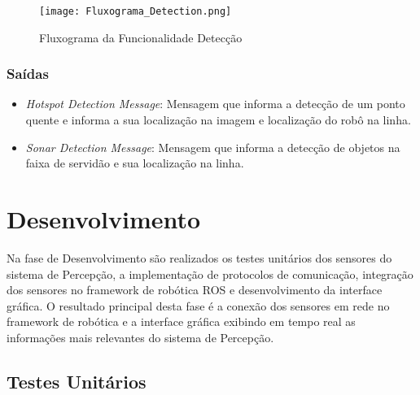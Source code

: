\begin{figure}[!ht]
	\centering
	\texttt{[image: Fluxograma\_Detection.png]}
	\caption{Fluxograma da Funcionalidade Detecção} \label{FuncDetec}
\end{figure}

\subsubsection{Saídas}

\begin{itemize}
	\item \textit{Hotspot Detection Message}: Mensagem que informa a detecção de um ponto quente e informa a sua localização na imagem e localização do robô na linha.
	\item \textit{Sonar Detection Message}: Mensagem que informa a detecção de objetos na faixa de servidão e sua localização na linha.
\end{itemize}
	
	\section{Desenvolvimento}
	Na fase de Desenvolvimento são realizados os testes unitários dos sensores do sistema de Percepção, a implementação de protocolos de comunicação, integração dos sensores no framework de robótica ROS e desenvolvimento da interface gráfica. O resultado principal desta fase é a conexão dos sensores em rede no framework de robótica e a interface gráfica exibindo em tempo real as informações mais relevantes do sistema de Percepção.
	
	
	\subsection{Testes Unitários}
	
